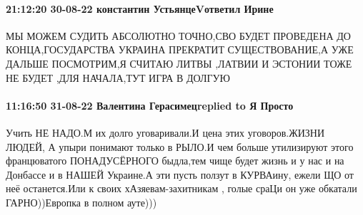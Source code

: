 \paragraph{21:12:20 30-08-22 константин УстьянцеVответил Ирине}

МЫ МОЖЕМ СУДИТЬ АБСОЛЮТНО ТОЧНО,СВО БУДЕТ ПРОВЕДЕНА ДО КОНЦА,ГОСУДАРСТВА
УКРАИНА ПРЕКРАТИТ СУЩЕСТВОВАНИЕ,А УЖЕ ДАЛЬШЕ ПОСМОТРИМ,Я СЧИТАЮ ЛИТВЫ ,ЛАТВИИ И
ЭСТОНИИ ТОЖЕ НЕ БУДЕТ ,ДЛЯ НАЧАЛА,ТУТ ИГРА В ДОЛГУЮ


\paragraph{11:16:50 31-08-22 Валентина Герасимецreplied to Я Просто}

Учить НЕ НАДО.М их долго уговаривали.И цена этих уговоров.ЖИЗНИ ЛЮДЕЙ, А упыри
понимают только в РЫЛО.И чем больше утилизируют этого францюватого
ПОНАДУСЁРНОГО быдла,тем чище будет жизнь и у нас и на Донбассе и в НАШЕЙ
Украине.А эти пусть ползут в КУРВАину, ежели ЩО от неё останется.Или к своих
хАзяевам-захитникам , голые сраЦи он уже обкатали ГАРНО))Европка в полном
ауте)))

